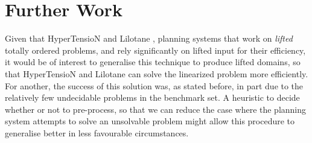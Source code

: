 \documentclass[runningheads]{llncs}
\begin{document}
\section{Further Work}
Given that HyperTensioN \cite{hypertension} and Lilotane \cite{Lilotane}, planning systems that work on \emph{lifted} totally ordered problems, and rely significantly on lifted input for their efficiency, it would be of interest to generalise this technique to produce lifted domains, so that HyperTensioN and Lilotane can solve the linearized problem more efficiently. For another, the success of this solution was, as stated before, in part due to the relatively few undecidable problems in the benchmark set. A heuristic to decide whether or not to pre-process, so that we can reduce the case where the planning system attempts to solve an unsolvable problem might allow this procedure to generalise better in less favourable circumstances. 

	


%
%
%






\end{document}
